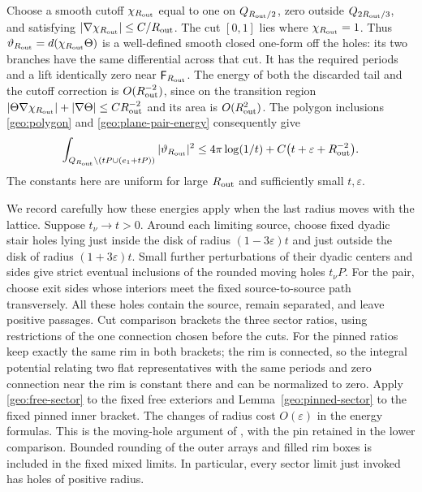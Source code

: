 Choose a smooth cutoff \(\chi_{R_{\rm out}}\) equal to one on
\(Q_{R_{\rm out}/2}\), zero outside \(Q_{2R_{\rm out}/3}\), and satisfying
\(|\nabla\chi_{R_{\rm out}}|\le C/R_{\rm out}\).
The cut \([0,1]\) lies where \(\chi_{R_{\rm out}}=1\).  Thus
\(\vartheta_{R_{\rm out}}=d(\chi_{R_{\rm out}}\Theta)\) is a well-defined smooth closed
one-form off the holes: its two branches have the same differential
across that cut.  It has the required periods and a lift identically
zero near \(\mathsf F_{R_{\rm out}}\).  The energy of both the discarded tail and
the cutoff correction is \(O(R_{\rm out}^{-2})\), since on the transition
region \(|\Theta\nabla\chi_{R_{\rm out}}|+|\nabla\Theta|
\le C R_{\rm out}^{-2}\) and its area is \(O(R_{\rm out}^2)\).  The polygon inclusions
\eqref{geo:polygon} and \eqref{geo:plane-pair-energy} consequently give
\begin{equation}\label{geo:pinned-trial-energy}
 \int_{Q_{R_{\rm out}}\setminus(tP\cup(e_1+tP))}|\vartheta_{R_{\rm out}}|^2
       \le4\pi\log(1/t)+C\bigl(t+\varepsilon+R_{\rm out}^{-2}\bigr).
\end{equation}
The constants here are uniform for large \(R_{\rm out}\) and sufficiently small
\(t,\varepsilon\).

We record carefully how these energies apply when the last radius moves
with the lattice.  Suppose \(t_\nu\to t>0\).  Around each limiting source,
choose fixed dyadic stair holes lying just inside the disk of radius
\((1-3\varepsilon)t\) and just outside the disk of radius
\((1+3\varepsilon)t\).  Small further perturbations of their dyadic
centers and sides give strict eventual inclusions of the rounded moving
holes \(t_\nu P\).  For the pair, choose exit sides whose interiors
meet the fixed source-to-source path transversely.
All these holes contain the source, remain separated,
and leave positive passages.  Cut comparison brackets the three sector
ratios, using restrictions of the one connection chosen before the cuts.
For the pinned ratios keep exactly the same rim in both brackets;
the rim is connected, so the integral potential relating two flat
representatives with the same periods and zero connection near the rim
is constant there and can be normalized to zero.  Apply
\eqref{geo:free-sector} to the fixed free exteriors and
Lemma~\ref{geo:pinned-sector} to the fixed pinned inner bracket.
The changes of radius cost \(O(\varepsilon)\) in the energy formulas.
This is the moving-hole argument of \cite[Lemma~6.2]{S}, with the pin
retained in the lower comparison.  Bounded rounding of the outer arrays
and filled rim boxes is included in the fixed mixed limits.  In
particular, every sector limit just invoked has holes of positive radius.

